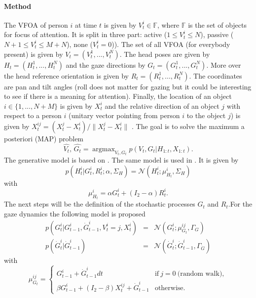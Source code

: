 \documentclass[11pt,a4paper]{article}
\DeclareMathOperator*{\argmax}{argmax}
\begin{document}
\paragraph{Method}
The VFOA of person $i$ at time $t$ is given by $V_t^i \in \mathbb{F}$, where $\mathbb{F}$ is the set of objects for focus of attention. It is split in three part: active ($1 \leq V_t^i \leq N$), passive ($N+1 \leq V_t^i \leq M+N$), none ($V_t^i =0$)). The set of all VFOA (for everybody present) is given by $V_t=(V_t^1,...,V_t^N)$. The head poses are given by $H_t=(H_t^1,...,H_t^N)$ and the gaze directions by $G_t=(G_t^1,...,G_t^N)$. More over the head reference orientation is given by $R_t=(R_t^1,...,R_t^N)$. The coordinates are pan and tilt angles (roll does not matter for gazing but it could be interesting to see if there is a meaning for attention). Finally, the location of an object $i \in \{1,...,N+M\}$ is given by $X_t^i$ and the relative direction of an object $j$ with respect to a person $i$ (unitary vector pointing from person $i$ to the object $j$) is given by $X_t^{ij} = (X_t^j-X_t^i)/\|X_t^j-X_t^i\|$ . The goal is to solve the maximum a posteriori (MAP) problem
\begin{equation}
\hat{V_t}, \, \hat{G_t} = \argmax_{V_t,G_t} p(V_t,G_t | H_{1:t},X_{1:t}).
\end{equation}
The generative model is based on \cite{Ba2009}. The same model is used in \cite{Sheikhi2O15}. It is given by
\begin{equation}
p(H_t^i | G_t^i, R_t^i; \alpha, \Sigma_H) = \mathcal{N}(H_t^i ; \mu_{H_t}^i, \Sigma_H)
\end{equation}
with
\begin{equation}
\mu_{H_t}^i = \alpha G_t^i + (I_2-\alpha)R_t^i.
\end{equation}
The next steps will be the definition of the stochastic processes $G_t$ and $R_t$.For the gaze dynamics the following model is proposed
\begin{equation}
\begin{array}{rcl}
p(G_t^i | G_{t-1}^i,\dot{G}_{t-1}^i, V_t^i = j, X_t^i) &=& \mathcal{N}(G_t^i; \mu_{G_t}^{ij}, \Gamma_G) \\
p(\dot{G}_t^i | \dot{G}_{t-1}^i) &=& \mathcal{N}(\dot{G}_{t}^i; \dot{G}_{t-1}^i, \Gamma_{\dot{G}})
\end{array}
\end{equation}
with
\begin{equation}
\mu_{G_t}^{ij} =
\left\{
\begin{array}{ll}
G_{t-1}^i + \dot{G}_{t-1}^i dt & \text{if}~j=0~\text{(random walk)},\\
\beta G_{t-1}^i + (I_2-\beta)X_t^{ij} + \dot{G}_{t-1}^i & \text{otherwise}.
\end{array}
\right.
\end{equation}
\end{document}
